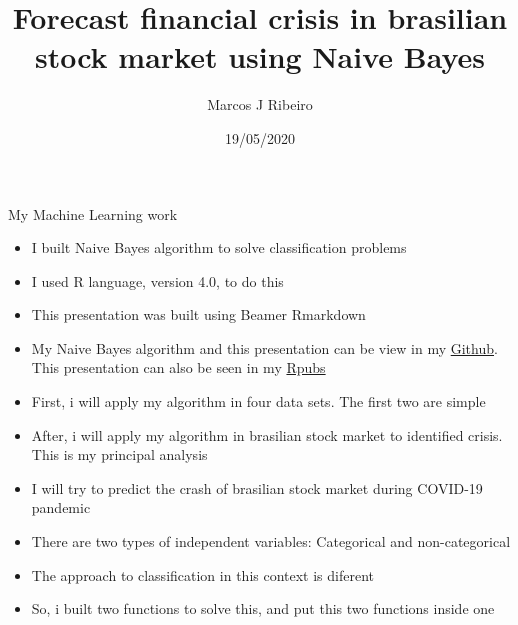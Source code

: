 \documentclass[
  10pt,
  ignorenonframetext,
]{beamer}
\title{Forecast financial crisis in brasilian stock market using Naive Bayes}
\author{Marcos J Ribeiro}
\date{19/05/2020}
\institute{FEARP-USP}
\begin{document}
\frame{\titlepage}

\begin{frame}{My Machine Learning work}
\protect\hypertarget{my-machine-learning-work}{}

\begin{itemize}
\item
  I built Naive Bayes algorithm to solve classification problems
\item
  I used R language, version 4.0, to do this
\item
  This presentation was built using Beamer Rmarkdown
\item
  My Naive Bayes algorithm and this presentation can be view in my
  \href{https://github.com/mj-ribeiro/College-works/tree/master/ML_1}{Github}.
  This presentation can also be seen in my
  \href{https://rpubs.com/mj-ribeiro/616774}{Rpubs}
\item
  First, i will apply my algorithm in four data sets. The first two are
  simple
\item
  After, i will apply my algorithm in brasilian stock market to
  identified crisis. This is my principal analysis
\item
  I will try to predict the crash of brasilian stock market during
  COVID-19 pandemic
\item
  There are two types of independent variables: Categorical and
  non-categorical
\item
  The approach to classification in this context is diferent
\item
  So, i built two functions to solve this, and put this two functions
  inside one
\end{itemize}

\end{frame}
\end{document}
